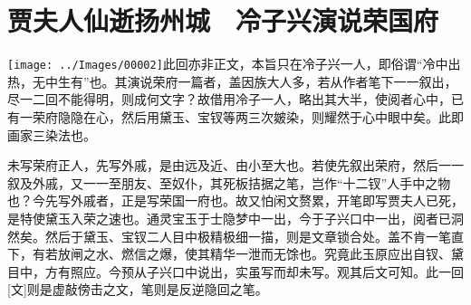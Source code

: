 \chapter{贾夫人仙逝扬州城　冷子兴演说荣国府}\label{part0006_split_000.htmlux5cux23calibre_pb_0}

\texttt{[image: ../Images/00002]}{\kaishu 此回亦非正文，本旨只在冷子兴一人，即俗谓``冷中出热，无中生有''也。其演说荣府一篇者，盖因族大人多，若从作者笔下一一叙出，尽一二回不能得明，则成何文字？故借用冷子一人，略出其大半，使阅者心中，已有一荣府隐隐在心，然后用黛玉、宝钗等两三次皴染，则耀然于心中眼中矣。此即画家三染法也。}%


{\kaishu 未写荣府正人，先写外戚，是由远及近、由小至大也。若使先叙出荣府，然后一一叙及外戚，又一一至朋友、至奴仆，其死板拮据之笔，岂作``十二钗''人手中之物也？今先写外戚者，正是写荣国一府也。故又怕闲文赘累，开笔即写贾夫人已死，是特使黛玉入荣之速也。通灵宝玉于士隐梦中一出，今于子兴口中一出，阅者已洞然矣。然后于黛玉、宝钗二人目中极精极细一描，则是文章锁合处。盖不肯一笔直下，有若放闸之水、燃信之爆，使其精华一泄而无馀也。究竟此玉原应出自钗、黛目中，方有照应。今预从子兴口中说出，实虽写而却未写。观其后文可知。此一回{[}文{]}则是虚敲傍击之文，笔则是反逆隐回之笔。}

